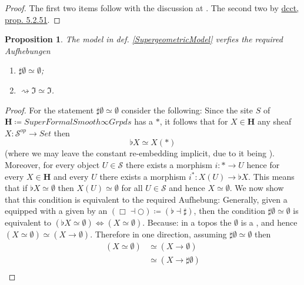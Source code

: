 \documentclass[12pt,titlepage]{article}
\theoremstyle{plain}
\newtheorem{prop}{Proposition}
\theoremstyle{definition}
\theoremstyle{remark}
\begin{document}
\begin{proof}
The first two items follow with the discussion at . The second two by \hyperlink{dcct}{dcct, prop. 5.2.51}.
\end{proof}
\begin{prop}
\label{SublationsRealized}\hypertarget{SublationsRealized}{}
The model in def. \ref{SupergeometricModel} verfies the required Aufhebungen
\begin{enumerate}%
\item $\sharp \emptyset \simeq \emptyset$;
\item $\rightsquigarrow \Im \simeq \Im$.
\end{enumerate}
\end{prop}
\begin{proof}
For the statement $\sharp \emptyset \simeq \emptyset$ consider the following:
Since the site $S$ of $\mathbf{H} \coloneqq SuperFormalSmooth\infty Grpds$ has a  $\ast$, it follows that for $X\in \mathbf{H}$ any sheaf $X \colon \mathcal{S}^{op}\to Set$ then
\begin{displaymath}
\flat X \simeq X(\ast)
\end{displaymath}
(where we may leave the constant re-embedding implicit, due to it being ).
Moreover, for every object $U\in \mathcal{S}$ there exists a morphism $i \colon \ast \to U$ hence for every $X\in \mathbf{H}$ and every $U$ there exists a morphism $i^\ast \colon X(U)\to \flat X$. This means that if $\flat X \simeq \emptyset$ then $X(U) \simeq \emptyset$ for all $U \in \mathcal{S}$ and hence $X\simeq \emptyset$.
We now show that this condition is equivalent to the required Aufhebung:
Generally, given a  equipped with a  given by an  $(\Box\dashv \bigcirc) \coloneqq (\flat \dashv \sharp)$, then the condition $\sharp \emptyset \simeq \emptyset$ is equivalent to $(\flat X \simeq \emptyset) \Leftrightarrow (X \simeq \emptyset)$.
Because: in a topos the  $\emptyset$ is a , and hence $(X \simeq \emptyset) \simeq (X \to \emptyset)$. Therefore in one direction, assuming $\sharp \emptyset \simeq \emptyset$ then
\begin{displaymath}
\begin{aligned}
(X \simeq \emptyset)
& \simeq
(X \to \emptyset)
\\
& \simeq (X \to \sharp \emptyset)
\\

\end{aligned}
\end{displaymath}
\end{proof}
\end{document}
